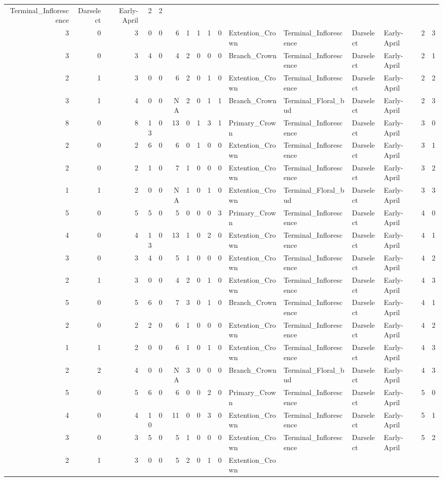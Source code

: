 \documentclass[]{article}
\begin{document}
\begin{longtable}[]{@{}rrrrrrrrrrllllrl@{}}
Terminal\_Inflorescence & Darselect & Early-April & 2 & 2\tabularnewline
3 & 0 & 3 & 0 & 0 & 6 & 1 & 1 & 1 & 0 & Extention\_Crown &
Terminal\_Inflorescence & Darselect & Early-April & 2 & 3\tabularnewline
3 & 0 & 3 & 4 & 0 & 4 & 2 & 0 & 0 & 0 & Branch\_Crown &
Terminal\_Inflorescence & Darselect & Early-April & 2 & 1\tabularnewline
2 & 1 & 3 & 0 & 0 & 6 & 2 & 0 & 1 & 0 & Extention\_Crown &
Terminal\_Inflorescence & Darselect & Early-April & 2 & 2\tabularnewline
3 & 1 & 4 & 0 & 0 & NA & 2 & 0 & 1 & 1 & Branch\_Crown &
Terminal\_Floral\_bud & Darselect & Early-April & 2 & 3\tabularnewline
8 & 0 & 8 & 13 & 0 & 13 & 0 & 1 & 3 & 1 & Primary\_Crown &
Terminal\_Inflorescence & Darselect & Early-April & 3 & 0\tabularnewline
2 & 0 & 2 & 6 & 0 & 6 & 0 & 1 & 0 & 0 & Extention\_Crown &
Terminal\_Inflorescence & Darselect & Early-April & 3 & 1\tabularnewline
2 & 0 & 2 & 1 & 0 & 7 & 1 & 0 & 0 & 0 & Extention\_Crown &
Terminal\_Inflorescence & Darselect & Early-April & 3 & 2\tabularnewline
1 & 1 & 2 & 0 & 0 & NA & 1 & 0 & 1 & 0 & Extention\_Crown &
Terminal\_Floral\_bud & Darselect & Early-April & 3 & 3\tabularnewline
5 & 0 & 5 & 5 & 0 & 5 & 0 & 0 & 0 & 3 & Primary\_Crown &
Terminal\_Inflorescence & Darselect & Early-April & 4 & 0\tabularnewline
4 & 0 & 4 & 13 & 0 & 13 & 1 & 0 & 2 & 0 & Extention\_Crown &
Terminal\_Inflorescence & Darselect & Early-April & 4 & 1\tabularnewline
3 & 0 & 3 & 4 & 0 & 5 & 1 & 0 & 0 & 0 & Extention\_Crown &
Terminal\_Inflorescence & Darselect & Early-April & 4 & 2\tabularnewline
2 & 1 & 3 & 0 & 0 & 4 & 2 & 0 & 1 & 0 & Extention\_Crown &
Terminal\_Inflorescence & Darselect & Early-April & 4 & 3\tabularnewline
5 & 0 & 5 & 6 & 0 & 7 & 3 & 0 & 1 & 0 & Branch\_Crown &
Terminal\_Inflorescence & Darselect & Early-April & 4 & 1\tabularnewline
2 & 0 & 2 & 2 & 0 & 6 & 1 & 0 & 0 & 0 & Extention\_Crown &
Terminal\_Inflorescence & Darselect & Early-April & 4 & 2\tabularnewline
1 & 1 & 2 & 0 & 0 & 6 & 1 & 0 & 1 & 0 & Extention\_Crown &
Terminal\_Inflorescence & Darselect & Early-April & 4 & 3\tabularnewline
2 & 2 & 4 & 0 & 0 & NA & 3 & 0 & 0 & 0 & Branch\_Crown &
Terminal\_Floral\_bud & Darselect & Early-April & 4 & 3\tabularnewline
5 & 0 & 5 & 6 & 0 & 6 & 0 & 0 & 2 & 0 & Primary\_Crown &
Terminal\_Inflorescence & Darselect & Early-April & 5 & 0\tabularnewline
4 & 0 & 4 & 10 & 0 & 11 & 0 & 0 & 3 & 0 & Extention\_Crown &
Terminal\_Inflorescence & Darselect & Early-April & 5 & 1\tabularnewline
3 & 0 & 3 & 5 & 0 & 5 & 1 & 0 & 0 & 0 & Extention\_Crown &
Terminal\_Inflorescence & Darselect & Early-April & 5 & 2\tabularnewline
2 & 1 & 3 & 0 & 0 & 5 & 2 & 0 & 1 & 0 & Extention\_Crown &

\end{longtable}
\end{document}
